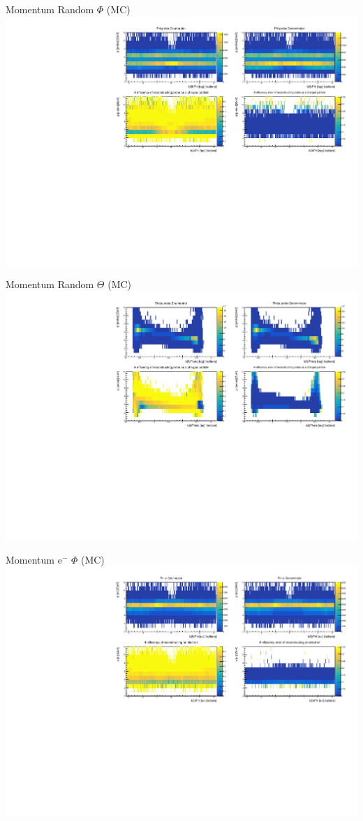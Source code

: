 \documentclass[10pt]{beamer}
\begin{document}
\begin{frame}{Momentum Random $\Phi$ (MC)}
	\centering
	\includegraphics[width=\textwidth]{Momentum/MPhiRandom_MC}
\end{frame}


\begin{frame}{Momentum Random $\Theta$ (MC)}
	\centering
	\includegraphics[width=\textwidth]{Momentum/MThetaRandom_MC}
\end{frame}
\begin{frame}{Momentum $\textrm{e}^-$ $\Phi$ (MC)}
	\centering
	\includegraphics[width=\textwidth]{Momentum/MPhiem_MC}
\end{frame}
\end{document}

